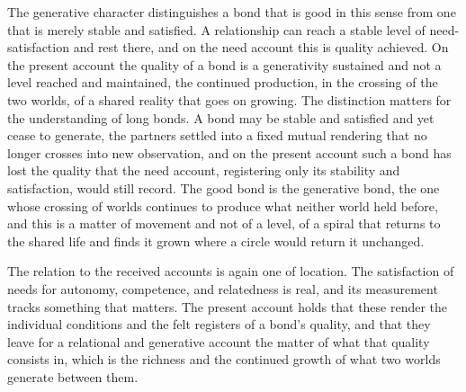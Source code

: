 The generative character distinguishes a bond that is good in this sense from one that is merely stable and satisfied. A relationship can reach a stable level of need-satisfaction and rest there, and on the need account this is quality achieved. On the present account the quality of a bond is a generativity sustained and not a level reached and maintained, the continued production, in the crossing of the two worlds, of a shared reality that goes on growing. The distinction matters for the understanding of long bonds. A bond may be stable and satisfied and yet cease to generate, the partners settled into a fixed mutual rendering that no longer crosses into new observation, and on the present account such a bond has lost the quality that the need account, registering only its stability and satisfaction, would still record. The good bond is the generative bond, the one whose crossing of worlds continues to produce what neither world held before, and this is a matter of movement and not of a level, of a spiral that returns to the shared life and finds it grown where a circle would return it unchanged.

The relation to the received accounts is again one of location. The satisfaction of needs for autonomy, competence, and relatedness is real, and its measurement tracks something that matters. The present account holds that these render the individual conditions and the felt registers of a bond's quality, and that they leave for a relational and generative account the matter of what that quality consists in, which is the richness and the continued growth of what two worlds generate between them.
